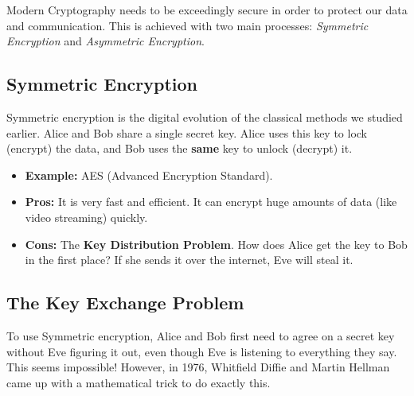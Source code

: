 \documentclass[11pt,a4paper]{report}
\begin{document}
Modern Cryptography needs to be exceedingly secure in order to protect our data and communication.
This is achieved with two main processes: \emph{Symmetric Encryption} and \emph{Asymmetric Encryption}.

\subsection{Symmetric Encryption}
Symmetric encryption is the digital evolution of the classical methods we studied earlier.
Alice and Bob share a single secret key. Alice uses this key to lock (encrypt) the data, and Bob uses the \textbf{same} key to unlock (decrypt) it.

\begin{itemize}
    \item \textbf{Example:} AES (Advanced Encryption Standard).
    \item \textbf{Pros:} It is very fast and efficient. It can encrypt huge amounts of data (like video streaming) quickly.
    \item \textbf{Cons:} The \textbf{Key Distribution Problem}. How does Alice get the key to Bob in the first place? If she sends it over the internet, Eve will steal it.
\end{itemize}

\subsection{The Key Exchange Problem}
To use Symmetric encryption, Alice and Bob first need to agree on a secret key without Eve figuring it out, even though Eve is listening to everything they say. This seems impossible!
However, in 1976, Whitfield Diffie and Martin Hellman came up with a mathematical trick to do exactly this.
\end{document}
